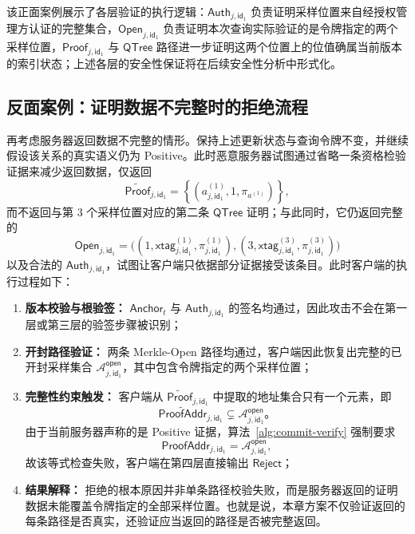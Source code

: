 该正面案例展示了各层验证的执行逻辑：$\mathsf{Auth}_{j,\mathsf{id}_1}$ 负责证明采样位置来自经授权管理方认证的完整集合，$\mathsf{Open}_{j,\mathsf{id}_1}$ 负责证明本次查询实际验证的是令牌指定的两个采样位置，$\mathsf{Proof}_{j,\mathsf{id}_1}$ 与 $\mathsf{QTree}$ 路径进一步证明这两个位置上的位值确属当前版本的索引状态；上述各层的安全性保证将在后续安全性分析中形式化。

\subsection{反面案例：证明数据不完整时的拒绝流程}

再考虑服务器返回数据不完整的情形。保持上述更新状态与查询令牌不变，并继续假设该关系的真实语义仍为 Positive。此时恶意服务器试图通过省略一条资格检验证据来减少返回数据，仅返回
\begin{equation}
\widetilde{\mathsf{Proof}}_{j,\mathsf{id}_1}=
\left\{
\left(a_{j,\mathsf{id}_1}^{(1)},1,\pi_{a^{(1)}}\right)
\right\},
\end{equation}
而不返回与第 $3$ 个采样位置对应的第二条 $\mathsf{QTree}$ 证明；与此同时，它仍返回完整的
\begin{equation}
\mathsf{Open}_{j,\mathsf{id}_1}=
\bigl(
(1,\mathsf{xtag}_{j,\mathsf{id}_1}^{(1)},\pi_{j,\mathsf{id}_1}^{(1)}),
(3,\mathsf{xtag}_{j,\mathsf{id}_1}^{(3)},\pi_{j,\mathsf{id}_1}^{(3)})
\bigr)
\end{equation}
以及合法的 $\mathsf{Auth}_{j,\mathsf{id}_1}$，试图让客户端只依据部分证据接受该条目。此时客户端的执行过程如下：
\begin{enumerate}
\item \textbf{版本校验与根验签：} $\mathsf{Anchor}_t$ 与 $\mathsf{Auth}_{j,\mathsf{id}_1}$ 的签名均通过，因此攻击不会在第一层或第三层的验签步骤被识别；
\item \textbf{开封路径验证：} 两条 Merkle-Open 路径均通过，客户端因此恢复出完整的已开封采样集合 $\mathcal{A}_{j,\mathsf{id}_1}^{\mathsf{open}}$，其中包含令牌指定的两个采样位置；
\item \textbf{完整性约束触发：} 客户端从 $\widetilde{\mathsf{Proof}}_{j,\mathsf{id}_1}$ 中提取的地址集合只有一个元素，即
\begin{equation}
\widetilde{\mathsf{ProofAddr}}_{j,\mathsf{id}_1}\subsetneq \mathcal{A}_{j,\mathsf{id}_1}^{\mathsf{open}}\text{。}
\end{equation}
由于当前服务器声称的是 Positive 证据，算法~\ref{alg:commit-verify} 强制要求
\begin{equation}
\mathsf{ProofAddr}_{j,\mathsf{id}_1}=\mathcal{A}_{j,\mathsf{id}_1}^{\mathsf{open}},
\end{equation}
故该等式检查失败，客户端在第四层直接输出 $\mathsf{Reject}$；
\item \textbf{结果解释：} 拒绝的根本原因并非单条路径校验失败，而是服务器返回的证明数据未能覆盖令牌指定的全部采样位置。也就是说，本章方案不仅验证返回的每条路径是否真实，还验证应当返回的路径是否被完整返回。
\end{enumerate}

